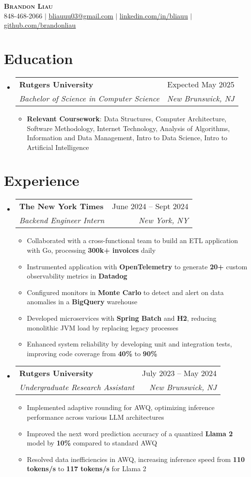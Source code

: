 \documentclass[letterpaper,11pt]{article}
\makeatletter
\newcommand{\resumeItem}[1]{
  \item\small{
    {#1 \vspace{-2pt}}
  }
}
\newcommand{\resumeSubheading}[4]{
  \vspace{-2pt}\item
    \begin{tabular*}{0.97\textwidth}[t]{l@{\extracolsep{\fill}}r}
      \textbf{#1} & #2 \\
      \textit{\small#3} & \textit{\small #4} \\
    \end{tabular*}\vspace{-7pt}
}
\newcommand{\resumeSubHeadingListStart}{\begin{itemize}[leftmargin=0.15in, label={}]}
\newcommand{\resumeSubHeadingListEnd}{\end{itemize}}
\newcommand{\resumeItemListStart}{\begin{itemize}}
\newcommand{\resumeItemListEnd}{\end{itemize}\vspace{-3pt}}
\makeatother
\begin{document}
\begin{center}
    \textbf{\Huge \scshape Brandon Liau} \\ \vspace{8pt}
    \small {} 848-468-2066 $|$ 
    \href{mailto:x@x.com}{ \underline{bliauuu03@gmail.com}} $|$ 
    \href{https://linkedin.com/in/bliauu}{ \underline{linkedin.com/in/bliauu}} $|$
    \href{https://github.com/brandonliau}{ \underline{github.com/brandonliau}}
\end{center}


\section{Education}
  \resumeSubHeadingListStart
    \resumeSubheading
      {Rutgers University}{Expected May 2025}
      {Bachelor of Science in Computer Science}{New Brunswick, NJ}
      \resumeItemListStart
        \resumeItem{\textbf{Relevant Coursework}: Data Structures, Computer Architecture, Software Methodology, Internet Technology, Analysis of Algorithms, Information and Data Management, Intro to Data Science, Intro to Artificial Intelligence}
      \resumeItemListEnd
  \resumeSubHeadingListEnd


\section{Experience}
  \resumeSubHeadingListStart
    \resumeSubheading
      {The New York Times}{June 2024 -- Sept 2024}
      {Backend Engineer Intern}{New York, NY}
      \resumeItemListStart
        \resumeItem{Collaborated with a cross-functional team to build an ETL application with Go, processing \textbf{300k+ invoices} daily}
        \resumeItem{Instrumented application with \textbf{OpenTelemetry} to generate \textbf{20+} custom observability metrics in \textbf{Datadog}}
        \resumeItem{Configured monitors in \textbf{Monte Carlo} to detect and alert on data anomalies in a \textbf{BigQuery} warehouse}
        \resumeItem{Developed microservices with \textbf{Spring Batch} and \textbf{H2}, reducing monolithic JVM load by replacing legacy processes}
        \resumeItem{Enhanced system reliability by developing unit and integration tests, improving code coverage from \textbf{40\%} to \textbf{90\%}}
      \resumeItemListEnd
    \resumeSubheading
      {Rutgers University}{July 2023 -- May 2024}
      {Undergraduate Research Assistant}{New Brunswick, NJ}
      \resumeItemListStart
        \resumeItem{Implemented adaptive rounding for AWQ, optimizing inference performance across various LLM architectures}
        \resumeItem{Improved the next word prediction accuracy of a quantized \textbf{Llama 2} model by \textbf{10\%} compared to standard AWQ}
        \resumeItem{Resolved data inefficiencies in AWQ, increasing inference speed from \textbf{110 tokens/s} to \textbf{117 tokens/s} for Llama 2}
      \resumeItemListEnd
  \resumeSubHeadingListEnd
\end{document}
